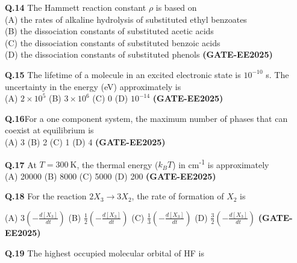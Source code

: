 \documentclass[12pt]{article}
\begin{document}
\begin{enumerate}
    \vspace{0.5cm}

    \textbf{Q.14} The Hammett reaction constant $\rho$ is based on\\
    (A) the rates of alkaline hydrolysis of substituted ethyl benzoates\\
    (B) the dissociation constants of substituted acetic acids\\
    (C) the dissociation constants of substituted benzoic acids\\
    (D) the dissociation constants of substituted phenols   \textbf{(GATE-EE2025)}


    \vspace{0.5cm}

    \textbf{Q.15} The lifetime of a molecule in an excited electronic state is $10^{-10}$ s. The uncertainty in the energy (eV) approximately is\\
    (A) $2 \times 10^5$ \quad (B) $3 \times 10^6$ \quad (C) 0 \quad (D) $10^{-14}$   \textbf{(GATE-EE2025)}


    \vspace{0.5cm}

    \textbf{Q.16}For a one component system, the maximum number of phases that can coexist at equilibrium is\\
    (A) 3 \quad (B) 2 \quad (C) 1 \quad (D) 4   \textbf{(GATE-EE2025)}


    \vspace{0.5cm}

    \textbf{Q.17} At $T = 300 \ \mathrm{K}$, the thermal energy ($k_B T$) in cm\textsuperscript{-1} is approximately\\
    (A) 20000 \quad (B) 8000 \quad (C) 5000 \quad (D) 200   \textbf{(GATE-EE2025)}


    \vspace{0.5cm}

    \textbf{Q.18} For the reaction $2 X_3 \rightarrow 3 X_2$, the rate of formation of $X_2$ is

(A) $3 \left(-\frac{d[X_3]}{dt}\right)$ \hspace{1cm}
(B) $\frac{1}{2} \left(-\frac{d[X_3]}{dt}\right)$ \hspace{1cm}
(C) $\frac{1}{3} \left(-\frac{d[X_3]}{dt}\right)$ \hspace{1cm}
(D) $\frac{3}{2} \left(-\frac{d[X_3]}{dt}\right)$   \textbf{(GATE-EE2025)}


\vspace{0.5cm}

\textbf{Q.19} The highest occupied molecular orbital of HF is


\end{enumerate}
\end{document}
